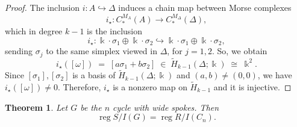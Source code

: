 \documentclass[12pt]{amsart}
\theoremstyle{plain}
\newtheorem{thm}{Theorem}[section]
\theoremstyle{definition}
\DeclareMathOperator{\reg}{reg}
\begin{document}
\begin{proof}
The inclusion $i\colon A\hookrightarrow\Delta$ induces a chain map between Morse complexes
\[
  i_{\star}\colon C^{M_A}_\ast(A) \longrightarrow C^{M_\Delta}_\ast(\Delta),
\]
which in degree $k-1$ is  the inclusion
\[
  i_{\star}\colon \Bbbk\cdot\sigma_1 \oplus \Bbbk\cdot\sigma_2
  \hookrightarrow 
  \Bbbk\cdot\sigma_1 \oplus \Bbbk\cdot\sigma_2,
\]
sending $\sigma_j$ to the same simplex viewed in $\Delta$, for $j=1,2$. So,  we obtain
\[
  i_{\star}([\omega]) 
  \;=\; [ a\sigma_1 + b\sigma_2 ] 
  \;\in\; \widetilde H_{k-1}(\Delta;\Bbbk)
  \;\cong\; \Bbbk^2.
\]
Since $[\sigma_1],[\sigma_2]$ is a basis of $\widetilde H_{k-1}(\Delta;\Bbbk)$ and $(a,b)\neq (0,0)$, we have $i_{\star}([\omega])\neq 0$. Therefore, $i_{\star}$ is a nonzero  map on $\widetilde H_{k-1}$ and it is injective.
\end{proof}



\begin{thm}\label{thm:cycle_spokes}
Let $G$ be the $n$ cycle with wide spokes. Then 
$$\reg S/ I(G)= \reg R/I(C_n).$$
\end{thm}
\end{document}
